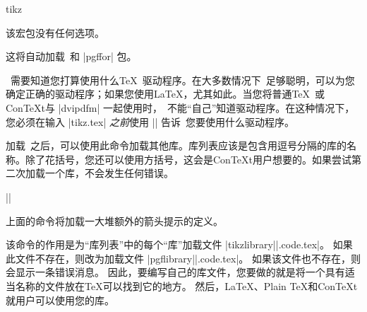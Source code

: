 \begin{package}{tikz}

    该宏包没有任何选项。


    这将自动加载\pgfname\ 和 |pgffor| 包。


    \pgfname\ 需要知道您打算使用什么\TeX\ 驱动程序。在大多数情况下\pgfname\ 足够聪明，可以为您确定正确的驱动程序；如果您使用\LaTeX ，尤其如此。当您将普通\TeX\ 或Con\TeX t与 |dvipdfm| 一起使用时，\pgfname\ 不能``自己''知道驱动程序。在这种情况下，您必须在输入 |tikz.tex| \emph{之前}使用 |\def\pgfsysdriver{pgfsys- dvipdfs .def}| 告诉\pgfname\ 您要使用什么驱动程序。
\end{package}

\begin{command}{\usetikzlibrary{}}

    加载\tikzname\ 之后，可以使用此命令加载其他库。库列表应该是包含用逗号分隔的库的名称。除了花括号，您还可以使用方括号，这会是Con\TeX t用户想要的。如果尝试第二次加载一个库，不会发生任何错误。

    \example |\usetikzlibrary{arrows.meta}|


    上面的命令将加载一大堆额外的箭头提示的定义。


    该命令的作用是为``库列表''中的每个``库''加载文件 |tikzlibrary||.code.tex|。 如果此文件不存在，则改为加载文件 |pgflibrary||.code.tex|。 如果该文件也不存在，则会显示一条错误消息。 因此，要编写自己的库文件，您要做的就是将一个具有适当名称的文件放在\TeX 可以找到它的地方。 然后，\LaTeX 、Plain \TeX 和Con\TeX t就用户可以使用您的库。
\end{command}


